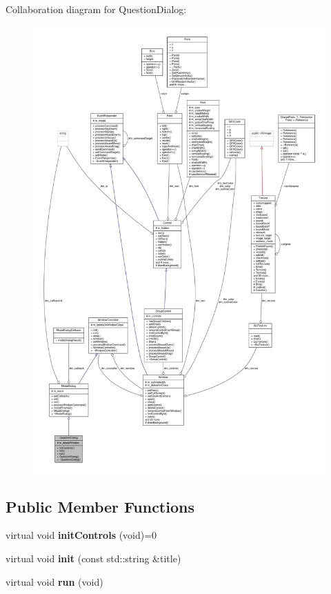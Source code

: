 Collaboration diagram for Question\+Dialog\+:
\nopagebreak
\begin{figure}[H]
\begin{center}
\leavevmode
\includegraphics[width=350pt]{d8/d02/classQuestionDialog__coll__graph}
\end{center}
\end{figure}
\subsection*{Public Member Functions}
\begin{DoxyCompactItemize}
\item 
virtual void {\bfseries init\+Controls} (void)=0\hypertarget{classQuestionDialog_a69e713fec6892879d528e335d6049103}{}\label{classQuestionDialog_a69e713fec6892879d528e335d6049103}

\item 
virtual void {\bfseries init} (const std\+::string \&title)\hypertarget{classQuestionDialog_ae2a1cc70d8d1e463478592ee4420a0d7}{}\label{classQuestionDialog_ae2a1cc70d8d1e463478592ee4420a0d7}

\item 
virtual void {\bfseries run} (void)\hypertarget{classQuestionDialog_aa48952c524e4dfee5e6b07a333b1181a}{}\label{classQuestionDialog_aa48952c524e4dfee5e6b07a333b1181a}

\end{DoxyCompactItemize}

